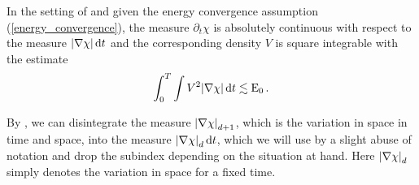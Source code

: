 \begin{proposition}
	\label{existence_of_velocity_twophase}
	In the setting of  and given the energy 
	convergence assumption (\ref{energy_convergence}), the measure $ \partial_{ 
		t } \chi $ is absolutely continuous with respect to the measure $ \abs{ 
		\nabla \chi } \dd{ t } $ and the corresponding density $ V $ is square 
	integrable with the estimate
	\begin{equation}
		\label{square_integrability_velocity_twophase}
		\int_{ 0 }^{ T }
		\int
		V^{ 2 }
		\abs{ \nabla \chi }
		\dd{ t }
		\lesssim
		\operatorname{E}_{ 0 }.
	\end{equation}
\end{proposition}

\begin{remark}
	By 
	\cite[Thm.~3.103]{ambrosio_fusco_pallara_functions_of_bv_and_free_discontinuity_problems},
	we can disintegrate the measure $ \abs{ \nabla \chi }_{ d + 1 } $, which 
	is the variation in space in time and space, into the measure $ \abs{ 
		\nabla \chi }_{ d } \dd{ t } $, which we will use by a slight abuse of 
	notation and drop the subindex depending on the situation at hand. Here $ 
	\abs{ \nabla \chi }_{ d } $ simply denotes the variation in space for a 
	fixed time.
\end{remark}

